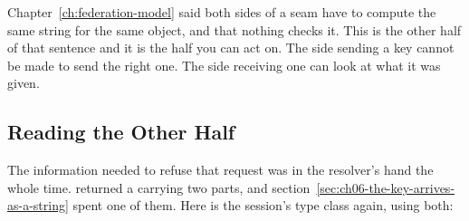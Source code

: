 %
Chapter~\ref{ch:federation-model} said both sides of a seam have to compute the
same string for the same object, and that nothing checks it. This is the other
half of that sentence and it is the half you can act on. The side sending a key
cannot be made to send the right one. The side receiving one can look at what it
was given.

\subsection{Reading the Other Half}

%
The information needed to refuse that request was in the resolver's hand the
whole time.  returned a  carrying two parts, and
section~\ref{sec:ch06-the-key-arrives-as-a-string} spent one of them. Here is
the session's type class again, using both:

